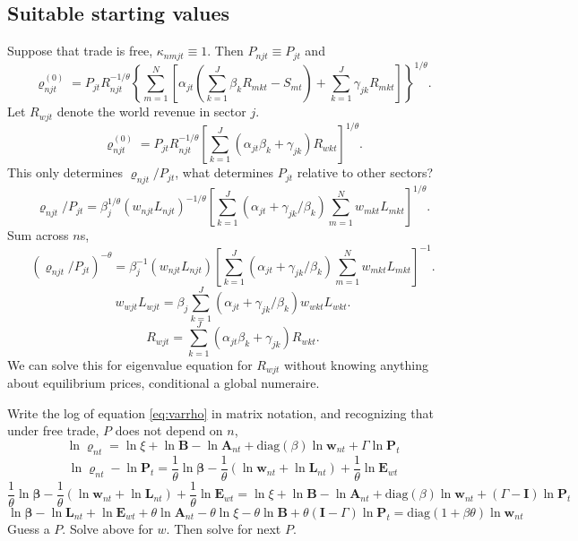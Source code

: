 \documentclass{article}
\begin{document}
\subsection{Suitable starting values}
Suppose that trade is free, $\kappa_{nmjt}\equiv 1$. Then $P_{njt}\equiv P_{jt}$ and
\begin{equation*}
	\varrho_{njt}^{(0)} = 
	P_{jt}
	R_{njt}^{-1/\theta}
	\left\{
	\sum_{m=1}^N
		\left[
			\alpha_{jt}
			\left(
				\sum_{k=1}^J\beta_k R_{mkt} - S_{mt}
			\right)
			+ \sum_{k=1}^J\gamma_{jk}R_{mkt}
		\right]
	\right\}^{1/\theta}.
\end{equation*}
Let $R_{wjt}$ denote the world revenue in sector $j$.
\begin{equation*}
	\varrho_{njt}^{(0)} = 
	P_{jt}
	R_{njt}^{-1/\theta}
		\left[
				\sum_{k=1}^J
				(\alpha_{jt}\beta_k + \gamma_{jk}) R_{wkt}
		\right]^{1/\theta}.
\end{equation*}
This only determines $\varrho_{njt}/P_{jt}$, what determines $P_{jt}$ relative to other sectors?\begin{equation*}
	\varrho_{njt}/P_{jt} = 
	\beta_j^{1/\theta}
	(w_{njt}L_{njt})^{-1/\theta}
		\left[
				\sum_{k=1}^J
				(\alpha_{jt} + \gamma_{jk}/\beta_k) 
				\sum_{m=1}^N w_{mkt}L_{mkt}
		\right]^{1/\theta}.
\end{equation*}
Sum across $n$s,
\begin{equation*}
	(\varrho_{njt}/P_{jt})^{-\theta} = 
	\beta_j^{-1}
	(w_{njt}L_{njt})
		\left[
				\sum_{k=1}^J
				(\alpha_{jt} + \gamma_{jk}/\beta_k) 
				\sum_{m=1}^N w_{mkt}L_{mkt}
		\right]^{-1}.
\end{equation*}
\begin{equation*}
	w_{wjt}L_{wjt}
	= \beta_j
				\sum_{k=1}^J
				(\alpha_{jt} + \gamma_{jk}/\beta_k) 
				w_{wkt}L_{wkt}.
\end{equation*}
\begin{equation*}
	R_{wjt}
	=
			\sum_{k=1}^J
			(\alpha_{jt}\beta_k + \gamma_{jk}) 
			R_{wkt}.
\end{equation*}
We can solve this for eigenvalue equation for $R_{wjt}$ without knowing anything about equilibrium prices, conditional a global numeraire.


Write the log of equation \eqref{eq:varrho} in matrix notation, and recognizing that under free trade, $P$ does not depend on $n$,
\[
\ln\mathbf \varrho_{nt} = \ln\xi
	+ \ln\mathbf B
	- \ln\mathbf A_{nt}
	+ \text{diag}(\beta) \ln\mathbf w_{nt}
	+ \Gamma \ln\mathbf P_{t}  
\]
\[
\ln\mathbf \varrho_{nt} - \ln\mathbf P_{t} 
 = \frac1\theta\ln\mathbf\beta
 	-\frac1\theta(\ln \mathbf w_{nt}+ \ln \mathbf L_{nt})
 	+\frac1\theta \ln \mathbf E_{wt}
\]
\[
\frac1\theta\ln\mathbf\beta
 	-\frac1\theta(\ln \mathbf w_{nt}+ \ln \mathbf L_{nt})
 	+\frac1\theta \ln \mathbf E_{wt}
=
\ln\xi
	+ \ln\mathbf B
	- \ln\mathbf A_{nt}
	+ \text{diag}(\beta) \ln\mathbf w_{nt}
	+ (\Gamma-\mathbf I) \ln\mathbf P_{t}
\]
\[
\ln\mathbf\beta
 	-\ln \mathbf L_{nt}
 	+ \ln \mathbf E_{wt}
	+ \theta\ln\mathbf A_{nt}
	-\theta\ln\xi
	- \theta\ln\mathbf B
	+ \theta(\mathbf I-\Gamma) \ln\mathbf P_{t}
=
	 \text{diag}(1+\beta\theta) \ln\mathbf w_{nt}
\]
Guess a $P$. Solve above for $w$. Then solve for next $P$.
\end{document}
